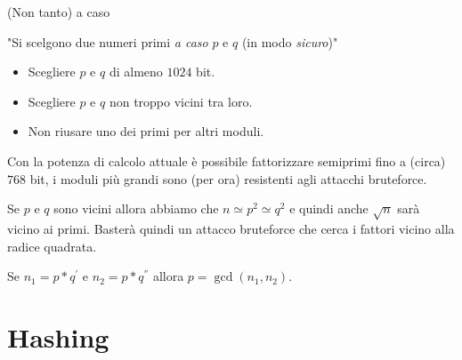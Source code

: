 \documentclass[xcolor=dvipsnames,aspectratio=169]{beamer}
\begin{document}
\begin{frame}{(Non tanto) a caso}

\pause

"Si scelgono due numeri primi \textit{a caso} $p$ e $q$ (in modo \textit{sicuro})"

\begin{itemize}
  \item Scegliere $p$ e $q$ di almeno $1024$ bit.
  \item Scegliere $p$ e $q$ non troppo vicini tra loro.
  \item Non riusare uno dei primi per altri moduli.
\end{itemize}

\smallskip
\pause
Con la potenza di calcolo attuale è possibile fattorizzare semiprimi fino a (circa) $768$ bit, i moduli più grandi sono (per ora) resistenti agli attacchi bruteforce.

\smallskip
\pause
Se $p$ e $q$ sono vicini allora abbiamo che $n \simeq p^2 \simeq q^2$ e quindi anche $\sqrt{n}$ sarà vicino ai primi. Basterà quindi un attacco bruteforce che cerca i fattori vicino alla radice quadrata.

\smallskip
\pause

Se $n_1 = p*q^{'}$ e $n_2 = p*q^{''}$ allora $p = \gcd(n_1, n_2)$.

\end{frame}


\part{Hashing}

\begin{frame}
	\partpage
	\centering
\end{frame}
\end{document}
